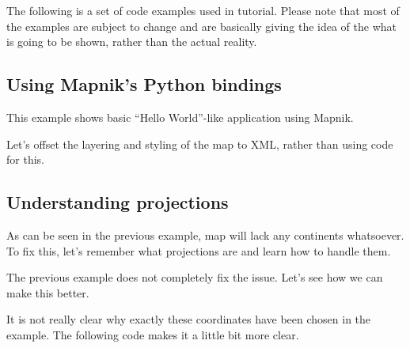 \documentclass[letterpaper]{article}
\begin{document}
The following is a set of code examples used in tutorial. Please
note that most of the examples are subject to change and are basically
giving the idea of the what is going to be shown, rather than the
actual reality.

\subsection{Using Mapnik's Python bindings}
\label{sec:using-mapniks-python}

This example shows basic ``Hello World''-like application using Mapnik.

\begin{centering}
    
\end{centering}

Let's offset the layering and styling of the map to XML, rather than using code
for this.

\begin{centering}
  
\end{centering}

\begin{centering}
    
\end{centering}

\subsection{Understanding projections}
\label{sec:underst-proj}

As can be seen in the previous example, map will lack any continents
whatsoever. To fix this, let's remember what projections are and
learn how to handle them.

\begin{centering}
    
\end{centering}

The previous example does not completely fix the issue. Let's see
how we can make this better.

\begin{centering}
    
\end{centering}

It is not really clear why exactly these coordinates have been chosen
in the example. The following code makes it a little bit more clear.

\begin{centering}
    
\end{centering}
\end{document}
